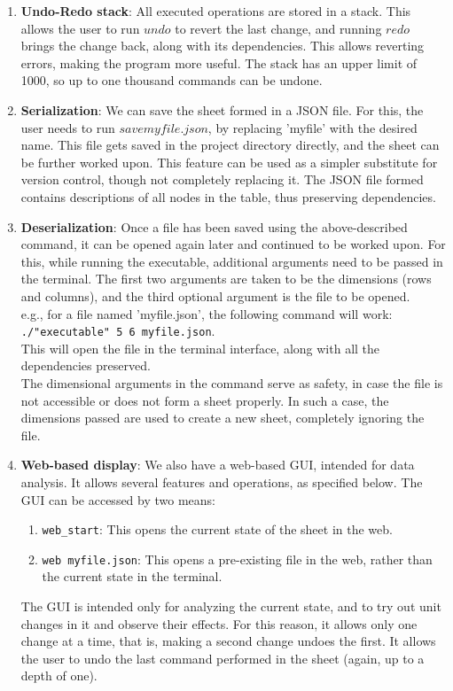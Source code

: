 \documentclass{article}
\begin{document}
\begin{enumerate}
    \item \textbf{Undo-Redo stack}: All executed operations are stored in a stack. This allows the user to run $undo$ to revert the last change, and running $redo$ brings the change back, along with its dependencies. This allows reverting errors, making the program more useful. 
    The stack has an upper limit of 1000, so up to one thousand commands can be undone.
    \item \textbf{Serialization}: We can save the sheet formed in a JSON file. For this, the user needs to run $save myfile.json$, by replacing 'myfile' with the desired name. This file gets saved in the project directory directly, and the sheet can be further worked upon. This feature can be used as a simpler substitute for version control, though not completely replacing it. The JSON file formed contains descriptions of all nodes in the table, thus preserving dependencies.
    \item \textbf{Deserialization}: Once a file has been saved using the above-described command, it can be opened again later and continued to be worked upon. For this, while running the executable, additional arguments need to be passed in the terminal. The first two arguments are taken to be the dimensions (rows and columns), and the third optional argument is the file to be opened.\\ e.g., for a file named 'myfile.json', the following command will work: \texttt{./"executable" 5 6 myfile.json}.\\ This will open the file in the terminal interface, along with all the dependencies preserved.\\The dimensional arguments in the command serve as safety, in case the file is not accessible or does not form a sheet properly. In such a case, the dimensions passed are used to create a new sheet, completely ignoring the file.
    \item \textbf{Web-based display}: We also have a web-based GUI, intended for data analysis. It allows several features and operations, as specified below. The GUI can be accessed by two means:
    \begin{enumerate}
        \item \texttt{web\_start}: This opens the current state of the sheet in the web.
        \item \texttt{web myfile.json}: This opens a pre-existing file in the web, rather than the current state in the terminal.
    \end{enumerate}
    The GUI is intended only for analyzing the current state, and to try out unit changes in it and observe their effects. For this reason, it allows only one change at a time, that is, making a second change undoes the first. It allows the user to undo the last command performed in the sheet (again, up to a depth of one).
\end{enumerate}
\end{document}

